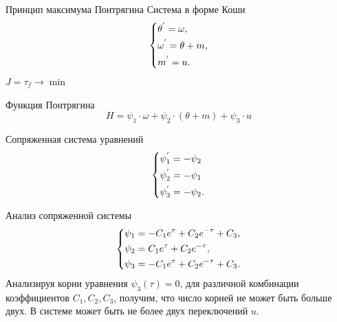 \documentclass[10pt]{beamer}
\begin{document}
\begin{frame}{Принцип максимума Понтрягина}
	Система в форме Коши
	\begin{equation}\label{koshisystem}
		\left\{ {\begin{aligned}
					 & \theta^{'} = \omega , \hfill   \\
					 & \omega^{'} = \theta+m , \hfill \\
					 & m^{'} = u . \hfill             \\
				\end{aligned}} \right.
	\end{equation}
	$J=\tau_f\to \min$

	Функция Понтрягина
	\[
		H=\psi_1\cdot\omega+\psi_2\cdot(\theta+m)+\psi_3\cdot u
	\]

	Сопряженная система уравнений
	\begin{equation} \label{7}
		\left\{ {\begin{aligned}
					 & \psi^{'}_1  = - \psi_2\hfill     \\
					 & \psi^{'}_2   = - \psi_1\hfill    \\
					 & \psi^{'}_3   = - \psi_2 . \hfill \\
				\end{aligned}} \right.
	\end{equation}

\end{frame}

\begin{frame}{Анализ сопряженной системы}
	\begin{equation}\label{psisystem}
		\left\{ {\begin{aligned}
					 & \psi_1 = -C_1e^\tau+C_2e^{-\tau}+C_3, \hfill  \\
					 & \psi_2 = C_1e^\tau+C_2e^{-\tau} , \hfill      \\
					 & \psi_3 = -C_1e^\tau+C_2e^{-\tau}+C_3 . \hfill \\
				\end{aligned}} \right.
	\end{equation}
	Анализируя корни уравнения $\psi_3(\tau)=0$, для различной комбинации
	коэффициентов $C_1,C_2,C_3$, получим, что число корней не может быть больше двух. В системе может быть не более двух переключений $u$.
\end{frame}
\end{document}
